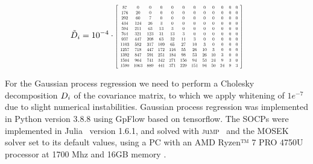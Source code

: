 \documentclass[final,3p,times,twocolumn]{elsarticle}  %
\newcommand\scalemath[2]{\scalebox{#1}{\mbox{\ensuremath{\displaystyle #2}}}}
\begin{document}
\begin{figure}
	\centering
	\begin{equation}
	\label{eq:Results_GPVariance_matrix}
	\tilde\Load_i = 10^{-4}\cdot
	\scalemath{0.525}{
		\left[
		\begin{array}{cccccccccccc}
		87   & 0    & 0   & 0   & 0   & 0   & 0   & 0  & 0  & 0  & 0 & 0 \\
		176  & 20   & 0   & 0   & 0   & 0   & 0   & 0  & 0  & 0  & 0 & 0 \\
		292  & 60   & 7   & 0   & 0   & 0   & 0   & 0  & 0  & 0  & 0 & 0 \\
		434  & 124  & 26  & 3   & 0   & 0   & 0   & 0  & 0  & 0  & 0 & 0 \\
		594  & 211  & 63  & 13  & 3   & 0   & 0   & 0  & 0  & 0  & 0 & 0 \\
		764  & 321  & 123 & 31  & 13  & 3   & 0   & 0  & 0  & 0  & 0 & 0 \\
		937  & 447  & 208 & 63  & 32  & 11  & 3   & 0  & 0  & 0  & 0 & 0 \\
		1103 & 582  & 317 & 109 & 65  & 27  & 10  & 3  & 0  & 0  & 0 & 0 \\
		1257 & 718  & 447 & 172 & 116 & 55  & 26  & 10 & 3  & 0  & 0 & 0 \\
		1392 & 847  & 591 & 251 & 184 & 98  & 53  & 26 & 10 & 3  & 0 & 0 \\
		1504 & 964  & 741 & 342 & 271 & 156 & 94  & 53 & 24 & 9  & 3 & 0 \\
		1590 & 1063 & 889 & 441 & 371 & 229 & 151 & 94 & 50 & 24 & 9 & 3
		\end{array}
		\right]
	}
	\end{equation}
	\vspace{\adjustlength}
\end{figure}


For the Gaussian process regression we need to perform a Cholesky decomposition $\Load_i$ of the covariance matrix, to which we apply whitening of $1e^{-7}$ due to slight numerical instabilities.
Gaussian process regression was implemented in Python \cite{10.5555/1593511} version 3.8.8 using GpFlow \cite{GPflow2017} based on tensorflow.
The SOCPs were implemented in Julia~\cite{Bezanson2017} version 1.6.1, and solved with \textsc{j}u\textsc{mp}~\cite{Dunning2017} and the MOSEK solver set to its default values, using a PC with an AMD Ryzen™ 7 PRO 4750U processor at 1700 Mhz and 16GB memory \cite{muhlpfordt_git_nodate}.
\end{document}
